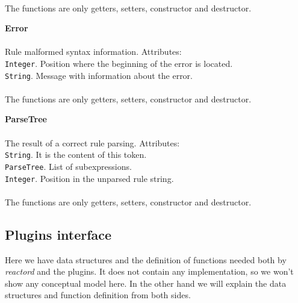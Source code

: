 \begin{list}{}{}
      \\
      The functions are only getters, setters, constructor and destructor.
  \item {\bf Error}\\
    \\
    Rule malformed syntax information.
    \subitem Attributes:
      \\
	\texttt{Integer}. Position where the beginning of the error is located.
      \\
	\texttt{String}. Message with information about the error.\\
    \\
    The functions are only getters, setters, constructor and destructor.
  \item {\bf ParseTree}\\
    \\
    The result of a correct rule parsing.
    \subitem Attributes:
      \\
	\texttt{String}. It is the content of this token.
      \\
	\texttt{ParseTree}. List of subexpressions.
      \\
	\texttt{Integer}. Position in the unparsed rule string.\\
    \\
    The functions are only getters, setters, constructor and destructor.
\end{list}
\subsection{Plugins interface}
\label{sec:plugins}
Here we have data structures and the definition of functions needed both by \emph{reactord} and the plugins. It does not contain 
any implementation, so we won't show any conceptual model here. In the other hand we will explain the data structures and function 
definition from both sides.\\
